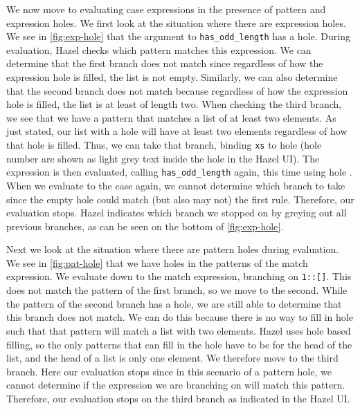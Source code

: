 We now move to evaluating case expressions in the presence of pattern and expression holes. We first look at the situation where there are expression holes. We see in \autoref{fig:exp-hole} that the argument to \texttt{has\_odd\_length} has a hole. During evaluation, Hazel checks which pattern matches this expression. We can determine that the first branch does not match since regardless of how the expression hole is filled, the list is not empty. Similarly, we can also determine that the second branch does not match because regardless of how the expression hole is filled, the list is at least of length two. When checking the third branch, we see that we have a pattern that matches a list of at least two elements. As just stated, our list with a hole will have at least two elements regardless of how that hole is filled. Thus, we can take that branch, binding \texttt{xs} to hole  (hole number are shown as light grey text inside the hole in the Hazel UI). The expression is then evaluated, calling \texttt{has\_odd\_length} again, this time using hole . When we evaluate to the case again, we cannot determine which branch to take since the empty hole could match (but also may not) the first rule. Therefore, our evaluation stops. Hazel indicates which branch we stopped on by greying out all previous branches, as can be seen on the bottom of \autoref{fig:exp-hole}.

Next we look at the situation where there are pattern holes during evaluation. We see in \autoref{fig:pat-hole} that we have holes in the patterns of the match expression. We evaluate down to the match expression, branching on \texttt{1::[]}. This does not match the pattern of the first branch, so we move to the second. While the pattern of the second branch has a hole, we are still able to determine that this branch does not match. We can do this because there is no way to fill in hole  such that that pattern will match a list with two elements. Hazel uses hole based filling, so the only patterns that can fill in the hole have to be for the head of the list, and the head of a list is only one element. We therefore move to the third branch. Here our evaluation stops since in this scenario of a pattern hole, we cannot determine if the expression we are branching on will match this pattern. Therefore, our evaluation stops on the third branch as indicated in the Hazel UI.
